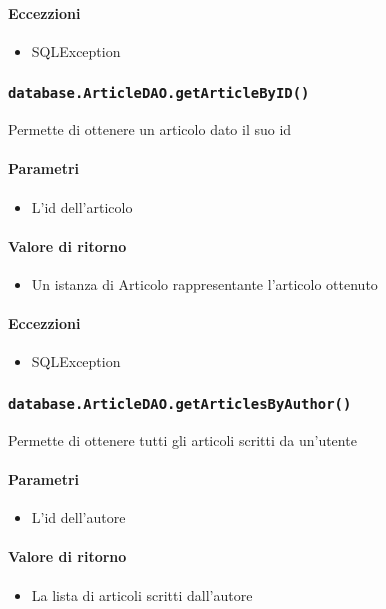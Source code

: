 \paragraph{Eccezzioni}
\begin{itemize}
  \item SQLException
\end{itemize}

\subsubsection{\texttt{database.ArticleDAO.getArticleByID()}}
Permette di ottenere un articolo dato il suo id
\paragraph{Parametri}
\begin{itemize}
\item L'id dell'articolo
\end{itemize}
\paragraph{Valore di ritorno}
\begin{itemize}
\item Un istanza di Articolo rappresentante l'articolo ottenuto
\end{itemize}
\paragraph{Eccezzioni}
\begin{itemize}
  \item SQLException
\end{itemize}

\subsubsection{\texttt{database.ArticleDAO.getArticlesByAuthor()}}
Permette di ottenere tutti gli articoli scritti da un'utente
\paragraph{Parametri}
\begin{itemize}
\item L'id dell'autore
\end{itemize}
\paragraph{Valore di ritorno}
\begin{itemize}
\item La lista di articoli scritti dall'autore
\end{itemize}
